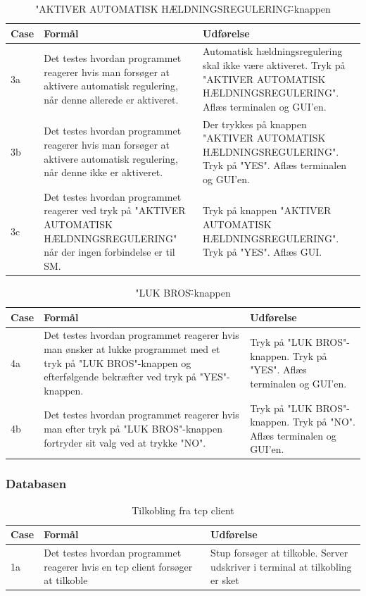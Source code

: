 \begin{table}[H]
\caption{"AKTIVER AUTOMATISK HÆLDNINGSREGULERING\"-knappen}
\centering
\begin{tabular}{| p{1cm}  | p{4.5cm} | p{8cm} |}
\hline
Case &Formål &Udførelse\\\hline
3a &Det testes hvordan programmet reagerer hvis man forsøger at aktivere automatisk regulering, når denne allerede er aktiveret. &Automatisk hældningsregulering skal ikke være aktiveret. Tryk på "AKTIVER AUTOMATISK HÆLDNINGSREGULERING". Aflæs terminalen og GUI'en.\\\hline

3b &Det testes hvordan programmet reagerer hvis man forsøger at aktivere automatisk regulering, når denne ikke er aktiveret. &Der trykkes på knappen "AKTIVER AUTOMATISK HÆLDNINGSREGULERING". Tryk på "YES". Aflæs terminalen og GUI'en.\\\hline

3c &Det testes hvordan programmet reagerer ved tryk på "AKTIVER AUTOMATISK HÆLDNINGSREGULERING" når der ingen forbindelse er til SM.&Tryk på knappen "AKTIVER AUTOMATISK HÆLDNINGSREGULERING". Tryk på "YES". Aflæs GUI.\\\hline
\end{tabular}
\end{table}

\begin{table}[H]
\caption{"LUK BROS\"-knappen}
\centering
\begin{tabular}{| p{1cm}  | p{4.5cm} | p{8cm} |}
\hline
Case &Formål &Udførelse\\\hline
4a &Det testes hvordan programmet reagerer hvis man ønsker at lukke programmet med et tryk på "LUK BROS"-knappen og efterfølgende bekræfter ved tryk på "YES"-knappen.&Tryk på "LUK BROS"-knappen. Tryk på "YES". Aflæs terminalen og GUI'en.\\\hline

4b &Det testes hvordan programmet reagerer hvis man efter tryk på "LUK BROS"-knappen fortryder sit valg ved at trykke "NO".&Tryk på "LUK BROS"-knappen. Tryk på "NO". Aflæs terminalen og GUI'en.\\\hline
\end{tabular}
\end{table}
\subsubsection{Databasen}
\begin{table}[H]
\caption{Tilkobling fra tcp client}
\centering
\begin{tabular}{| p{1cm}  | p{4.5cm} | p{8cm} |}
\hline
Case &Formål &Udførelse\\\hline
1a &Det testes hvordan programmet reagerer hvis en tcp client forsøger at tilkoble &Stup forsøger at tilkoble. Server udskriver i terminal at tilkobling er sket\\\hline
\end{tabular}
\end{table}

